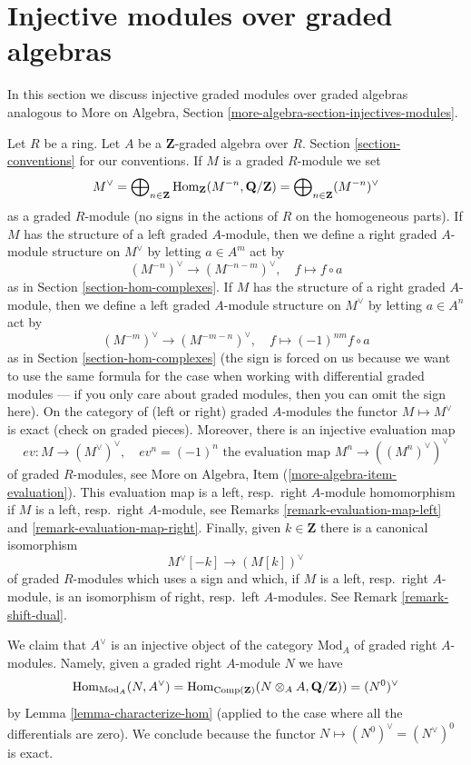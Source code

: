 \section{Injective modules over graded algebras}
\label{section-modules-noncommutative-graded}

\noindent
In this section we discuss injective graded modules over graded algebras
analogous to
More on Algebra, Section \ref{more-algebra-section-injectives-modules}.

\medskip\noindent
Let $R$ be a ring. Let $A$ be a $\mathbf{Z}$-graded algebra over $R$.
Section \ref{section-conventions} for our conventions.
If $M$ is a graded $R$-module we set
$$
M^\vee =
\bigoplus\nolimits_{n \in \mathbf{Z}}
\mathop{\mathrm{Hom}}\nolimits_\mathbf{Z}(M^{-n}, \mathbf{Q}/\mathbf{Z}) =
\bigoplus\nolimits_{n \in \mathbf{Z}} (M^{-n})^\vee
$$
as a graded $R$-module (no signs in the actions of $R$ on the
homogeneous parts). If $M$ has the structure of a left graded
$A$-module, then we define a right graded $A$-module structure
on $M^\vee$ by letting $a \in A^m$ act by
$$
(M^{-n})^\vee \to (M^{-n - m})^\vee, \quad
f \mapsto f \circ a
$$
as in Section \ref{section-hom-complexes}.
If $M$ has the structure of a right graded
$A$-module, then we define a left graded $A$-module structure
on $M^\vee$ by letting $a \in A^n$ act by
$$
(M^{-m})^\vee \to (M^{-m - n})^\vee, \quad
f \mapsto (-1)^{nm}f \circ a
$$
as in Section \ref{section-hom-complexes} (the sign is forced on
us because we want to use the same formula for the case
when working with differential graded modules --- if you only
care about graded modules, then you can omit the sign here).
On the category of (left or right) graded $A$-modules the
functor $M \mapsto M^\vee$ is exact (check on graded pieces).
Moreover, there is an injective evaluation map
$$
ev : M \longrightarrow (M^\vee)^\vee, \quad
ev^n = (-1)^n \text{ the evaluation map }M^n \to ((M^n)^\vee)^\vee
$$
of graded $R$-modules, see
More on Algebra, Item (\ref{more-algebra-item-evaluation}).
This evaluation map is a left, resp.\ right $A$-module homomorphism
if $M$ is a left, resp.\ right $A$-module, see
Remarks \ref{remark-evaluation-map-left} and \ref{remark-evaluation-map-right}.
Finally, given $k \in \mathbf{Z}$ there is a canonical isomorphism
$$
M^\vee[-k] \longrightarrow (M[k])^\vee
$$
of graded $R$-modules which uses a sign and which, if
$M$ is a left, resp.\ right $A$-module, is an isomorphism
of right, resp.\ left $A$-modules. See Remark \ref{remark-shift-dual}.

\medskip\noindent
We claim that $A^\vee$ is an injective object of the category
$\text{Mod}_A$ of graded right $A$-modules. Namely, given a graded
right $A$-module $N$ we have
$$
\mathop{\mathrm{Hom}}\nolimits_{\text{Mod}_A}(N, A^\vee) =
\mathop{\mathrm{Hom}}\nolimits_{\text{Comp}(\mathbf{Z})}(N \otimes_A A, \mathbf{Q}/\mathbf{Z})) =
(N^0)^\vee
$$
by Lemma \ref{lemma-characterize-hom}
(applied to the case where all the differentials are zero).
We conclude because the functor $N \mapsto (N^0)^\vee = (N^\vee)^0$
is exact.


